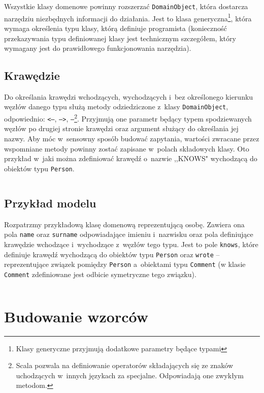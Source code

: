 \documentclass[brudnopis]{xmgr}
\begin{document}
Wszystkie klasy domenowe powinny rozszerzać \texttt{DomainObject}, która dostarcza narzędziu niezbędnych informacji do działania. Jest to klasa generyczna\footnote{Klasy generyczne  przyjmują dodatkowe parametry będące typami}, która wymaga określenia typu klasy, którą definiuje programista (konieczność przekazywania typu definiowanej klasy jest technicznym szczegółem, który wymagany jest do prawidłowego funkcjonowania narzędzia). 

\subsection{Krawędzie}

Do określania krawędzi wchodzących, wychodzących i~bez określonego kierunku węzłów danego typu służą metody odziedziczone z~klasy \texttt{DomainObject}, odpowiednio:  \texttt{<--}, \texttt{-->}, \texttt{--}\footnote{Scala pozwala na definiowanie operatorów składających się ze znaków uchodzących w~innych językach za specjalne. Odpowiadają one zwykłym metodom.}. Przyjmują one parametr będący typem spodziewanych węzłów po drugiej stronie krawędzi oraz argument służący do określania jej nazwy. Aby móc w~sensowny sposób budować zapytania, wartości zwracane przez wspomniane metody powinny zostać zapisane w~polach składowych klasy. Oto przykład w~jaki można zdefiniować krawędź o~nazwie ,,KNOWS" wychodzącą do obiektów typu \texttt{Person}.

\inputminted{scala}{listings/scala/dsl/simple-relation.scala}

\subsection{Przykład modelu}

Rozpatrzmy przykładową klasę domenową reprezentującą osobę. Zawiera ona pola \texttt{name} oraz \texttt{surname} odpowiadające imieniu i~nazwisku oraz pola definiujące krawędzie wchodzące i~wychodzące z~węzłów tego typu. Jest to pole \texttt{knows}, które definiuje krawędź wychodzącą do obiektów typu \texttt{Person} oraz \texttt{wrote} -- reprezentujące związek pomiędzy \texttt{Person} a~obiektami typu \texttt{Comment} (w klasie \texttt{Comment} zdefiniowane jest odbicie symetryczne tego związku).

\inputminted{scala}{listings/scala/dsl/sample-model.scala}

\section{Budowanie wzorców}
\end{document}
